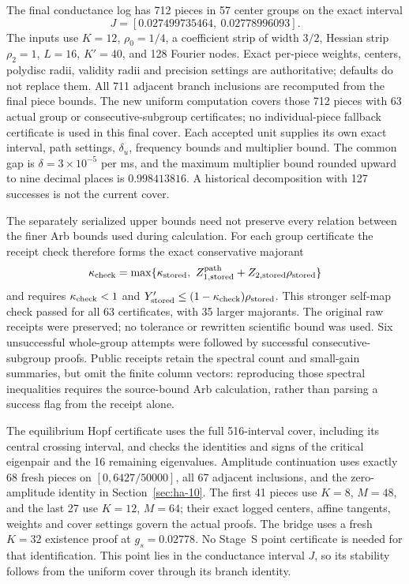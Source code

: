 \documentclass[11pt]{article}
\theoremstyle{definition}
\begin{document}
The final conductance log has 712 pieces in 57 center groups on the exact interval
\[
 J=[0.027499735464,\ 0.02778996093].
\]
The inputs use $K=12$, $\rho_0=1/4$, a coefficient strip of width $3/2$, Hessian strip $\rho_2=1$, $L=16$, $K'=40$, and 128 Fourier nodes. Exact per-piece weights, centers, polydisc radii, validity radii and precision settings are authoritative; defaults do not replace them. All 711 adjacent branch inclusions are recomputed from the final piece bounds. The new uniform computation covers those 712 pieces with 63 actual group or consecutive-subgroup certificates; no individual-piece fallback certificate is used in this final cover. Each accepted unit supplies its own exact interval, path settings, $\delta_u$, frequency bounds and multiplier bound. The common gap is $\delta=3\times10^{-5}$ per ms, and the maximum multiplier bound rounded upward to nine decimal places is $0.998413816$. A historical decomposition with 127 successes is not the current cover.

The separately serialized upper bounds need not preserve every relation between the finer Arb bounds used during calculation. For each group certificate the receipt check therefore forms the exact conservative majorant
\[
 \kappa_{\rm check}=\max\{\kappa_{\rm stored},\ Z_{1,\rm stored}^{\rm path}+Z_{2,\rm stored}\rho_{\rm stored}\}
\]
and requires $\kappa_{\rm check}<1$ and $Y'_{\rm stored}\le(1-\kappa_{\rm check})\rho_{\rm stored}$. This stronger self-map check passed for all 63 certificates, with 35 larger majorants. The original raw receipts were preserved; no tolerance or rewritten scientific bound was used. Six unsuccessful whole-group attempts were followed by successful consecutive-subgroup proofs. Public receipts retain the spectral count and small-gain summaries, but omit the finite column vectors: reproducing those spectral inequalities requires the source-bound Arb calculation, rather than parsing a success flag from the receipt alone.

The equilibrium Hopf certificate uses the full 516-interval cover, including its central crossing interval, and checks the identities and signs of the critical eigenpair and the 16 remaining eigenvalues. Amplitude continuation uses exactly 68 fresh pieces on $[0,6427/50000]$, all 67 adjacent inclusions, and the zero-amplitude identity in Section~\ref{sec:ha-10}. The first 41 pieces use $K=8$, $M=48$, and the last 27 use $K=12$, $M=64$; their exact logged centers, affine tangents, weights and cover settings govern the actual proofs. The bridge uses a fresh $K=32$ existence proof at $g_s=0.02778$. No Stage~S point certificate is needed for that identification. This point lies in the conductance interval $J$, so its stability follows from the uniform cover through its branch identity.
\end{document}

